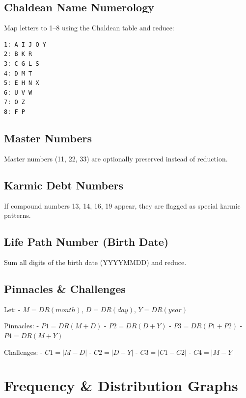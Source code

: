 \documentclass[
  american,
  11pt,
  oneside,
  openany]{article}
\begin{document}
\subsection{Chaldean Name Numerology}\label{chaldean-name-numerology}

Map letters to 1--8 using the Chaldean table and reduce:

\begin{verbatim}
1: A I J Q Y
2: B K R
3: C G L S
4: D M T
5: E H N X
6: U V W
7: O Z
8: F P
\end{verbatim}

\subsection{Master Numbers}\label{master-numbers}

Master numbers (11, 22, 33) are optionally preserved instead of
reduction.

\subsection{Karmic Debt Numbers}\label{karmic-debt-numbers}

If compound numbers 13, 14, 16, 19 appear, they are flagged as special
karmic patterns.

\subsection{Life Path Number (Birth
Date)}\label{life-path-number-birth-date}

Sum all digits of the birth date (YYYYMMDD) and reduce.

\subsection{Pinnacles \& Challenges}\label{pinnacles-challenges}

Let: - \(M = DR(month)\), \(D = DR(day)\), \(Y = DR(year)\)

Pinnacles: - \(P1 = DR(M + D)\) - \(P2 = DR(D + Y)\) -
\(P3 = DR(P1 + P2)\) - \(P4 = DR(M + Y)\)

Challenges: - \(C1 = |M - D|\) - \(C2 = |D - Y|\) - \(C3 = |C1 - C2|\) -
\(C4 = |M - Y|\)

\section{Frequency \& Distribution
Graphs}\label{frequency-distribution-graphs}
\end{document}

